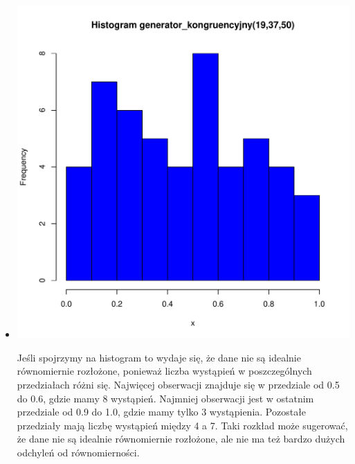 \documentclass[12pt, a4paper]{article}\usepackage[]{graphicx}\usepackage[]{xcolor}
\makeatletter
\def\maxwidth{ %
  \ifdim\Gin@nat@width>\linewidth
    \linewidth
  \else
    \Gin@nat@width
  \fi
}
\newenvironment{knitrout}{}{} %
\makeatother
\begin{document}
\begin{itemize}
\break
\item
\begin{minipage}{\linewidth}
\begin{knitrout}
\color{fgcolor}

{\centering \includegraphics[width=\maxwidth]{figure/unnamed-chunk-4-1} 

}


\end{knitrout}
\end{minipage}
Jeśli spojrzymy na histogram to wydaje się, że dane nie są idealnie równomiernie rozłożone, ponieważ liczba wystąpień w poszczególnych przedziałach różni się.
Najwięcej obserwacji znajduje się w przedziale od 0.5 do 0.6, gdzie mamy 8 wystąpień. Najmniej obserwacji jest w ostatnim przedziale od 0.9 do 1.0, gdzie mamy tylko 3 wystąpienia. Pozostałe przedziały mają liczbę wystąpień między 4 a 7.
Taki rozkład może sugerować, że dane nie są idealnie równomiernie rozłożone, ale nie ma też bardzo dużych odchyleń od równomierności.


\begin{knitrout}
\color{fgcolor}


\end{knitrout}
\end{itemize}
\end{document}
